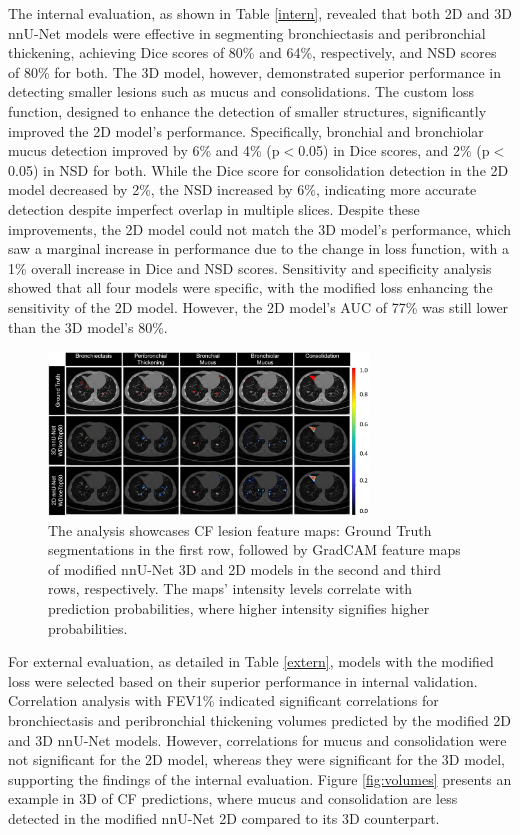 \documentclass{article}
\begin{document}
The internal evaluation, as shown in Table \ref{intern}, revealed that both 2D and 3D nnU-Net models were effective in segmenting bronchiectasis and peribronchial thickening, achieving Dice scores of 80\% and 64\%, respectively, and NSD scores of 80\% for both. The 3D model, however, demonstrated superior performance in detecting smaller lesions such as mucus and consolidations. The custom loss function, designed to enhance the detection of smaller structures, significantly improved the 2D model's performance. Specifically, bronchial and bronchiolar mucus detection improved by 6\% and 4\% (p$<$0.05) in Dice scores, and 2\% (p$<$0.05) in NSD for both. While the Dice score for consolidation detection in the 2D model decreased by 2\%, the NSD increased by 6\%, indicating more accurate detection despite imperfect overlap in multiple slices. Despite these improvements, the 2D model could not match the 3D model's performance, which saw a marginal increase in performance due to the change in loss function, with a  1\% overall increase in Dice and NSD scores. Sensitivity and specificity analysis showed that all four models were specific, with the modified loss enhancing the sensitivity of the 2D model. However, the 2D model's AUC of 77\% was still lower than the 3D model's 80\%. 


\begin{figure}
	\centering
		\includegraphics[width=8.5cm]{images/gradcam2.eps}
	\caption{The analysis showcases CF lesion feature maps: Ground Truth segmentations in the first row, followed by GradCAM feature maps of modified nnU-Net 3D and 2D models in the second and third rows, respectively. The maps' intensity levels correlate with prediction probabilities, where higher intensity signifies higher probabilities.}
	\label{fig:gradcam}
\end{figure}

For external evaluation, as detailed in Table \ref{extern}, models with the modified loss were selected based on their superior performance in internal validation. Correlation analysis with FEV1\% indicated significant correlations for bronchiectasis and peribronchial thickening volumes predicted by the modified 2D and 3D nnU-Net models. However, correlations for mucus and consolidation were not significant for the 2D model, whereas they were significant for the 3D model, supporting the findings of the internal evaluation. Figure \ref{fig:volumes} presents an example in 3D of CF predictions, where mucus and consolidation are less detected in the modified nnU-Net 2D compared to its 3D counterpart.
\end{document}
